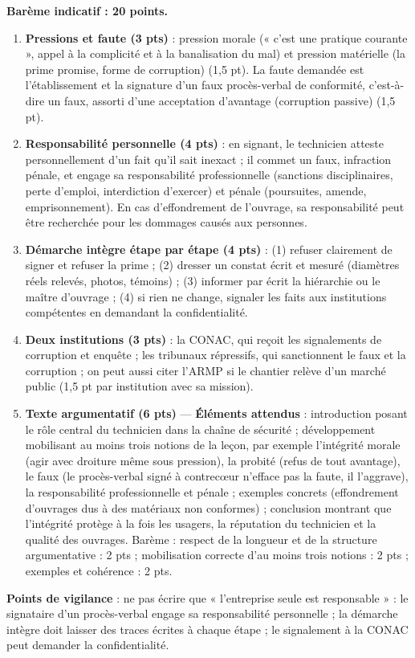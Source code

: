 \documentclass[11pt]{article}
\newcommand{\cle}[1]{{\popxbold\color{popdark}#1}}
\begin{document}
\begin{corrige}
\textbf{Barème indicatif : 20 points.}

\begin{enumerate}
\item \textbf{Pressions et faute (3 pts)} : pression morale (« c'est une pratique courante », appel à la complicité et à la banalisation du mal) et pression matérielle (la prime promise, forme de corruption) (1,5 pt). La faute demandée est l'établissement et la signature d'un faux procès-verbal de conformité, c'est-à-dire un faux, assorti d'une acceptation d'avantage (corruption passive) (1,5 pt).
\item \textbf{Responsabilité personnelle (4 pts)} : en signant, le technicien atteste personnellement d'un fait qu'il sait inexact ; il commet un faux, infraction pénale, et engage sa responsabilité professionnelle (sanctions disciplinaires, perte d'emploi, interdiction d'exercer) et pénale (poursuites, amende, emprisonnement). En cas d'effondrement de l'ouvrage, sa responsabilité peut être recherchée pour les dommages causés aux personnes.
\item \textbf{Démarche intègre étape par étape (4 pts)} : (1) refuser clairement de signer et refuser la prime ; (2) dresser un constat écrit et mesuré (diamètres réels relevés, photos, témoins) ; (3) informer par écrit la hiérarchie ou le maître d'ouvrage ; (4) si rien ne change, signaler les faits aux institutions compétentes en demandant la confidentialité.
\item \textbf{Deux institutions (3 pts)} : la CONAC, qui reçoit les signalements de corruption et enquête ; les tribunaux répressifs, qui sanctionnent le faux et la corruption ; on peut aussi citer l'ARMP si le chantier relève d'un marché public (1,5 pt par institution avec sa mission).
\item \textbf{Texte argumentatif (6 pts)} — \textbf{Éléments attendus} : introduction posant le rôle central du technicien dans la chaîne de sécurité ; développement mobilisant au moins trois notions de la leçon, par exemple l'\cle{intégrité morale} (agir avec droiture même sous pression), la \cle{probité} (refus de tout avantage), le \cle{faux} (le procès-verbal signé à contrecœur n'efface pas la faute, il l'aggrave), la \cle{responsabilité} professionnelle et pénale ; exemples concrets (effondrement d'ouvrages dus à des matériaux non conformes) ; conclusion montrant que l'intégrité protège à la fois les usagers, la réputation du technicien et la qualité des ouvrages. Barème : respect de la longueur et de la structure argumentative : 2 pts ; mobilisation correcte d'au moins trois notions : 2 pts ; exemples et cohérence : 2 pts.
\end{enumerate}
\textbf{Points de vigilance} : ne pas écrire que « l'entreprise seule est responsable » : le signataire d'un procès-verbal engage sa responsabilité personnelle ; la démarche intègre doit laisser des traces écrites à chaque étape ; le signalement à la CONAC peut demander la confidentialité.
\end{corrige}
\end{document}
